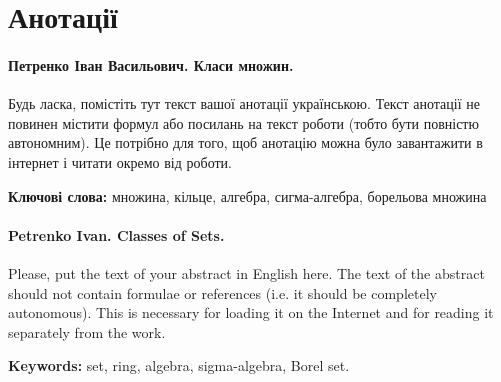 \chapter*{Анотації}


\subsubsection{Петренко Іван Васильович. Класи множин.}
Будь ласка, помістіть тут текст вашої анотації українською. Текст анотації не повинен містити формул або посилань на текст роботи (тобто бути повністю автономним). Це потрібно для того, щоб анотацію можна було завантажити в інтернет і читати окремо від роботи.

\textbf{Ключові слова:} множина, кільце, алгебра, сигма-алгебра, борельова множина





\subsubsection{Petrenko Ivan. Classes of Sets.}
	Please, put the  text of your abstract in English here. The text of the abstract should not contain formulae or references (i.e. it should be completely autonomous). This is necessary for loading it on the Internet and for reading it separately from the work.

\textbf{Keywords:} set, ring, algebra, sigma-algebra, Borel set.


